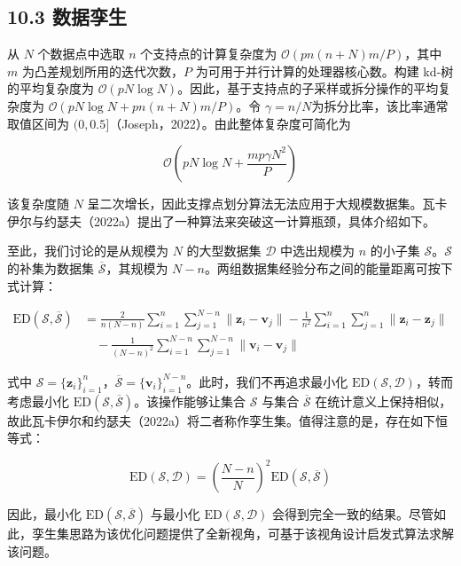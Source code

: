 \documentclass{ctexart}
\begin{document}
\subsection*{10.3 数据孪生}

从 $N$ 个数据点中选取 $n$ 个支持点的计算复杂度为 $\mathcal{O}(pn(n+N)m/P)$，其中 $m$ 为凸差规划所用的迭代次数，$P$ 为可用于并行计算的处理器核心数。构建 kd‑树的平均复杂度为 $\mathcal{O}(pN\log N)$。因此，基于支持点的子采样或拆分操作的平均复杂度为 $\mathcal{O}(pN\log N+pn(n+N)m/P)$。令 $\gamma=n/N$为拆分比率，该比率通常取值区间为 $(0,0.5]$（Joseph，2022）。由此整体复杂度可简化为

\begin{equation*}
\mathcal{O}\left(pN\log N+\frac{mp\gamma N^2}{P}\right)
\end{equation*}

该复杂度随 $N$ 呈二次增长，因此支撑点划分算法无法应用于大规模数据集。瓦卡伊尔与约瑟夫（2022a）提出了一种算法来突破这一计算瓶颈，具体介绍如下。

至此，我们讨论的是从规模为 $N$ 的大型数据集 $\mathcal{D}$ 中选出规模为 $n$ 的小子集 $\mathcal{S}$。$\mathcal{S}$ 的补集为数据集 $\overline{\mathcal{S}}$，其规模为 $N-n$。两组数据集经验分布之间的能量距离可按下式计算：

\begin{align*}
\mathrm{ED}(\mathcal{S},\overline{\mathcal{S}})&=\frac{2}{n(N-n)}\sum_{i=1}^{n}\sum_{j=1}^{N-n}\|\boldsymbol{z}_i-\boldsymbol{v}_j\|-\frac{1}{n^2}\sum_{i=1}^{n}\sum_{j=1}^{n}\|\boldsymbol{z}_i-\boldsymbol{z}_j\|\\
&\quad-\frac{1}{(N-n)^2}\sum_{i=1}^{N-n}\sum_{j=1}^{N-n}\|\boldsymbol{v}_i-\boldsymbol{v}_j\|
\end{align*}

式中 $\mathcal{S}=\{\boldsymbol{z}_i\}_{i=1}^{n}$，$\overline{\mathcal{S}}=\{\boldsymbol{v}_i\}_{i=1}^{N-n}$。此时，我们不再追求最小化 $\mathrm{ED}(\mathcal{S},\mathcal{D})$，转而考虑最小化 $\mathrm{ED}(\mathcal{S},\overline{\mathcal{S}})$。该操作能够让集合 $\mathcal{S}$ 与集合 $\overline{\mathcal{S}}$ 在统计意义上保持相似，故此瓦卡伊尔和约瑟夫（2022a）将二者称作孪生集。值得注意的是，存在如下恒等式：

\begin{equation*}
\mathrm{ED}(\mathcal{S},\mathcal{D})=\left(\frac{N-n}{N}\right)^2\mathrm{ED}(\mathcal{S},\overline{\mathcal{S}})
\tag{10.2}
\end{equation*}

因此，最小化 $\mathrm{ED}(\mathcal{S},\overline{\mathcal{S}})$ 与最小化 $\mathrm{ED}(\mathcal{S},\mathcal{D})$ 会得到完全一致的结果。尽管如此，孪生集思路为该优化问题提供了全新视角，可基于该视角设计启发式算法求解该问题。
\end{document}

